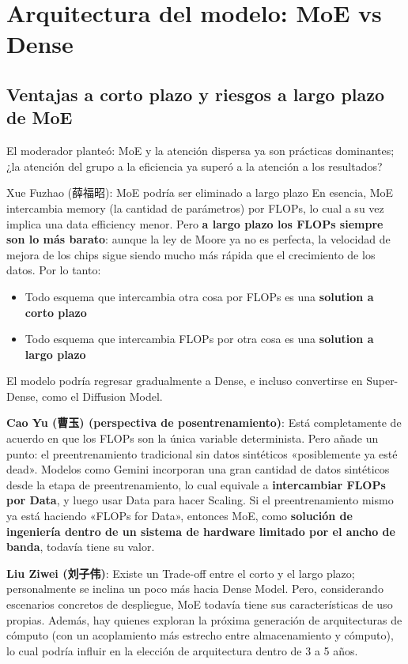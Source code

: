 \documentclass[a4paper]{article}
\begin{document}
\section{Arquitectura del modelo: MoE vs Dense}

\subsection{Ventajas a corto plazo y riesgos a largo plazo de MoE}

El moderador planteó: MoE y la atención dispersa ya son prácticas dominantes; ¿la atención del grupo a la eficiencia ya superó a la atención a los resultados?

\begin{importantbox}{Xue Fuzhao (薛福昭): MoE podría ser eliminado a largo plazo}
En esencia, MoE intercambia memory (la cantidad de parámetros) por FLOPs, lo cual a su vez implica una data efficiency menor. Pero \textbf{a largo plazo los FLOPs siempre son lo más barato}: aunque la ley de Moore ya no es perfecta, la velocidad de mejora de los chips sigue siendo mucho más rápida que el crecimiento de los datos. Por lo tanto:
\begin{itemize}
  \item Todo esquema que intercambia otra cosa por FLOPs es una \textbf{solution a corto plazo}
  \item Todo esquema que intercambia FLOPs por otra cosa es una \textbf{solution a largo plazo}
\end{itemize}
El modelo podría regresar gradualmente a Dense, e incluso convertirse en Super-Dense, como el Diffusion Model.
\end{importantbox}

\textbf{Cao Yu (曹玉) (perspectiva de posentrenamiento)}: Está completamente de acuerdo en que los FLOPs son la única variable determinista. Pero añade un punto: el preentrenamiento tradicional sin datos sintéticos «posiblemente ya esté dead». Modelos como Gemini incorporan una gran cantidad de datos sintéticos desde la etapa de preentrenamiento, lo cual equivale a \textbf{intercambiar FLOPs por Data}, y luego usar Data para hacer Scaling. Si el preentrenamiento mismo ya está haciendo «FLOPs for Data», entonces MoE, como \textbf{solución de ingeniería dentro de un sistema de hardware limitado por el ancho de banda}, todavía tiene su valor.

\textbf{Liu Ziwei (刘子伟)}: Existe un Trade-off entre el corto y el largo plazo; personalmente se inclina un poco más hacia Dense Model. Pero, considerando escenarios concretos de despliegue, MoE todavía tiene sus características de uso propias. Además, hay quienes exploran la próxima generación de arquitecturas de cómputo (con un acoplamiento más estrecho entre almacenamiento y cómputo), lo cual podría influir en la elección de arquitectura dentro de 3 a 5 años.
\end{document}
